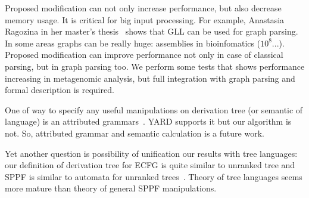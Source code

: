 \documentclass[runningheads,a4paper]{llncs}
\begin{document}
Proposed modification can not only increase performance, but also decrease memory usage. 
It is critical for big input processing.
For example, Anastasia Ragozina in her master's thesis~\cite{ragozina} shows that GLL can be used for graph parsing.  
In some areas graphs can be really huge: assemblies in bioinfomatics ($10^8$...).
Proposed modification can improve performance not only in case of classical parsing, but in graph parsing too. 
We perform some tests that shows performance increasing in metagenomic analysis, but full integration with graph parsing and formal description is required.

One of way to specify any useful manipulations on derivation tree (or semantic of language) is an attributed grammars~\cite{!!!}.
YARD supports it but our algorithm is not.
So, attributed grammar and semantic calculation is a future work.

Yet another question is possibility of unification our results with tree languages: our definition of derivation tree for ECFG is quite similar to unranked tree and SPPF is similar to automata for unranked trees~\cite{TATA}.
Theory of tree languages seems more mature than theory of general SPPF manipulations.





\end{document}

